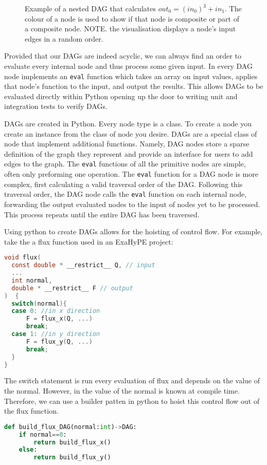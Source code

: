 \begin{figure}[h!]
    \centering
    \hspace{1em}
    \caption{Example of a nested DAG that calculates $out_0 = (in_0)^3 + in_1$. The colour of a node is used to show if that node is composite or part of a composite node. NOTE. the visualisation displays a node's input edges in a random order.}\label{fig:bn}
\end{figure}

Provided that our DAGs are indeed acyclic, we can always find an order to evaluate every internal node and thus process some given input.
In \phlat every DAG node implements an \texttt{eval} function which takes an array on input values, applies that node's function to the input, and output the results.
This allows DAGs to be evaluated directly within Python opening up the door to writing unit and integration tests to verify DAGs.

DAGs are created in Python.
Every node type is a class.
To create a node you create an instance from the class of node you desire.
DAGs are a special class of node that implement additional functions.
Namely, DAG nodes store a sparse definition of the graph they represent and provide an interface for users to add edges to the graph.
The \texttt{eval} functions of all the primitive nodes are simple, often only preforming one operation.
The \texttt{eval} function for a DAG node is more complex, first calculating a valid traversal order of the DAG.
Following this traversal order, the DAG node calls the \texttt{eval} function on each internal node, forwarding the output evaluated nodes to the input of nodes yet to be processed.
This process repeats until the entire DAG has been traversed.

Using python to create DAGs allows for the hoisting of control flow.
For example, take the a flux function used in an ExaHyPE project:
\begin{lstlisting}[language=c]
void flux(
  const double * __restrict__ Q, // input
  ...
  int normal,
  double * __restrict__ F // output
)  {
  switch(normal){  
  case 0: //in x direction
	  F = flux_x(Q, ...)
	  break;
  case 1: //in y direction
	  F = flux_y(Q, ...)
	  break;
  }  
}
\end{lstlisting}
The switch statement is run every evaluation of flux and depends on the value of the normal.
However, in  the value of the normal is known at compile time.
Therefore, we can use a builder patten in python to hoist this control flow out of the flux function.
\begin{lstlisting}[language=python]
def build_flux_DAG(normal:int)->DAG:
    if normal==0:
        return build_flux_x()
    else:
        return build_flux_y()
\end{lstlisting}




